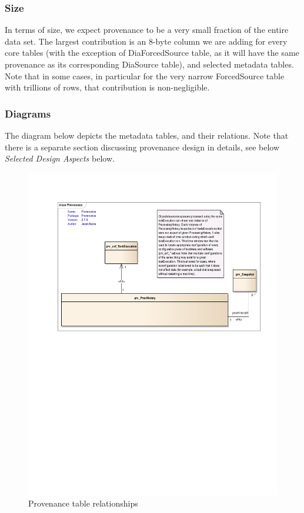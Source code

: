 \documentclass[DM,lsstdraft,toc]{lsstdoc}
\begin{document}
\subsubsection{Size}

In terms of size, we expect provenance to be a very small fraction of the entire data set. The largest contribution is an 8-byte column we are adding for every core tables (with the exception of DiaForcedSource table, as it will have the same provenance as its corresponding DiaSource table), and selected metadata tables. Note that in some cases, in particular for the very narrow ForcedSource table with trillions of rows, that contribution is non-negligible.

\subsubsection{Diagrams}

The diagram below depicts the metadata tables, and their relations. Note that there is a separate section discussing provenance design in details, see below \textit{Selected Design Aspects} below.

\begin{figure}
  \centering\includegraphics[scale=0.80]{diagrams/provenance}
  \caption{Provenance table relationships}
\end{figure}
\end{document}
